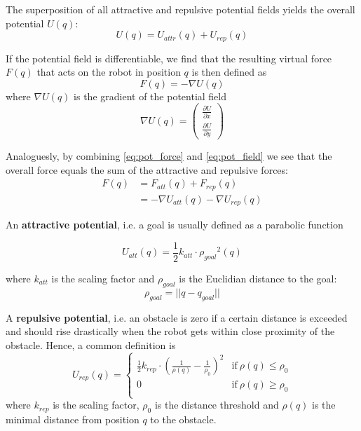 The superposition of all attractive and repulsive potential fields yields the overall potential $U(q)$:
\begin{equation}
U(q) = U_{attr}(q) + U_{rep}(q)
	\label{eq:pot_field}
\end{equation}

If the potential field is differentiable, we find that the resulting virtual force $F(q)$ that acts on the robot in position $q$ is then defined as 
\begin{equation}
F(q) = - \nabla U(q) 
	\label{eq:pot_force}
\end{equation}
where $\nabla U(q)$ is the gradient of the potential field
\begin{equation}
\nabla U(q) = \begin{pmatrix}
\frac{\partial U}{\partial x} \\
\frac{\partial U}{\partial y}
\end{pmatrix}
	\label{eq:gradient}
\end{equation}

Analoguesly, by combining \ref{eq:pot_force} and \ref{eq:pot_field} we see that the overall force equals the sum of the attractive and repulsive forces:
\begin{equation}
\begin{aligned}
F(q) &= F_{att}(q) + F_{rep}(q) \\
&= -\nabla U_{att}(q)-\nabla U_{rep}(q)
\end{aligned}
\end{equation}


An \textbf{attractive potential}, i.e. a goal is usually defined as a parabolic function

\begin{equation}
U_{att}(q) = \frac{1}{2} k_{att} \cdot {\rho_{goal}}^2(q)
\end{equation}

where $k_{att}$ is the scaling factor and $\rho_{goal}$ is the Euclidian distance to the goal:
\begin{equation}
\rho_{goal} = ||q-q_{goal}||
\end{equation}


A \textbf{repulsive potential}, i.e. an obstacle is zero if a certain distance is exceeded and should rise drastically when the robot gets within close proximity of the obstacle. Hence, a common definition is
\begin{equation}
U_{rep}(q) = \begin{cases}
      \frac{1}{2} k_{rep}\cdot (\frac{1}{\rho (q)}-\frac{1}{\rho_0})^2 & \text{if}\ \rho (q) \leq \rho_0 \\
      0 & \text{if}\ \rho (q) \geq \rho_0 \\
    \end{cases}
    \label{eq:pot_field_repulsive}
\end{equation}
where $k_{rep}$ is the scaling factor, $\rho_0$ is the distance threshold and $\rho (q)$ is the minimal distance from position $q$ to the obstacle.

